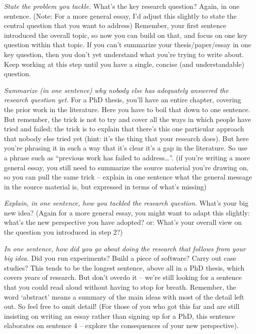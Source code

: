 \emph{State the problem you tackle.}
What’s the key research question?
Again, in one sentence.
(Note: For a more general essay, I’d adjust this slightly to state the central question that you want to address)
Remember, your first sentence introduced the overall topic, so now you can build on that, and focus on one key question within that topic.
If you can’t summarize your thesis/paper/essay in one key question, then you don’t yet understand what you’re trying to write about.
Keep working at this step until you have a single, concise (and understandable) question.

\emph{Summarize (in one sentence) why nobody else has adequately answered the research question yet.}
For a PhD thesis, you’ll have an entire chapter, covering the prior work in the literature.
Here you have to boil that down to one sentence.
But remember, the trick is not to try and cover all the ways in which people have tried and failed; the trick is to explain that there’s this one particular approach that nobody else tried yet (hint: it’s the thing that your research does).
But here you’re phrasing it in such a way that it’s clear it’s a gap in the literature.
So use a phrase such as “previous work has failed to address…”.
(if you’re writing a more general essay, you still need to summarize the source material you’re drawing on, so you can pull the same trick – explain in one sentence what the general message in the source material is, but expressed in terms of what’s missing)

\emph{Explain, in one sentence, how you tackled the research question.}
What’s your big new idea?
(Again for a more general essay, you might want to adapt this slightly: what’s the new perspective you have adopted? or:
What’s your overall view on the question you introduced in step 2?)

\emph{In one sentence, how did you go about doing the research that follows from your big idea.}
Did you run experiments?
Build a piece of software?
Carry out case studies?
This tends to be the longest sentence, above all in a PhD thesis, which covers years of research.
But don’t overdo it – we’re still looking for a sentence that you could read aloud without having to stop for breath.
Remember, the word ‘abstract’ means a summary of the main ideas with most of the detail left out.
So feel free to omit detail!
(For those of you who got this far and are still insisting on writing an essay rather than signing up for a PhD, this sentence elaborates on sentence 4 – explore the consequences of your new perspective).

